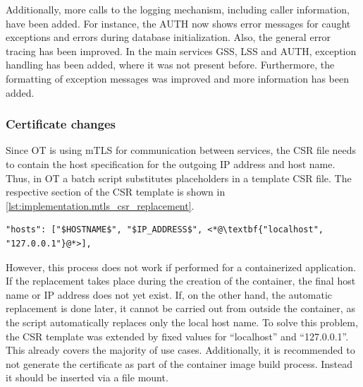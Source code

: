 Additionally, more calls to the logging mechanism, including caller information, have been added. For instance, the \ac{AUTH} now shows error messages for caught exceptions and errors during database initialization.
Also, the general error tracing has been improved. In the main services \ac{GSS}, \ac{LSS} and \ac{AUTH}, exception handling has been added, where it was not present before. Furthermore, the formatting of exception messages was improved and more information has been added.


\subsubsection*{Certificate changes}
Since \ac{OT} is using \ac{mTLS} for communication between services, the \ac{CSR} file needs to contain the host specification for the outgoing \ac{IP} address and host name. Thus, in \ac{OT} a batch script substitutes placeholders in a template \ac{CSR} file. The respective section of the \ac{CSR} template is shown in \autoref{lst:implementation.mtls_csr_replacement}.
\begin{lstlisting}[label=lst:implementation.mtls_csr_replacement, caption={Variables defined in the \ac{CSR} are substituted by their respective values. The static host definition for \enquote{localhost} and \enquote{127.0.0.1} have been added. (\textit{/Deployment/\hspace{0.01em}Certificates/server-csr\_template.json})}, language={}, firstnumber=3]
  "hosts": ["$HOSTNAME$", "$IP_ADDRESS$", <*@\textbf{"localhost", "127.0.0.1"}@*>],
\end{lstlisting}
However, this process does not work if performed for a containerized application. If the replacement takes place during the creation of the container, the final host name or \ac{IP} address does not yet exist. If, on the other hand, the automatic replacement is done later, it cannot be carried out from outside the container, as the script automatically replaces only the local host name.
To solve this problem, the \ac{CSR} template was extended by fixed values for \enquote{localhost} and \enquote{127.0.0.1}. This already covers the majority of use cases. Additionally, it is recommended to not generate the certificate as part of the container image build process. Instead it should be inserted via a file mount.

